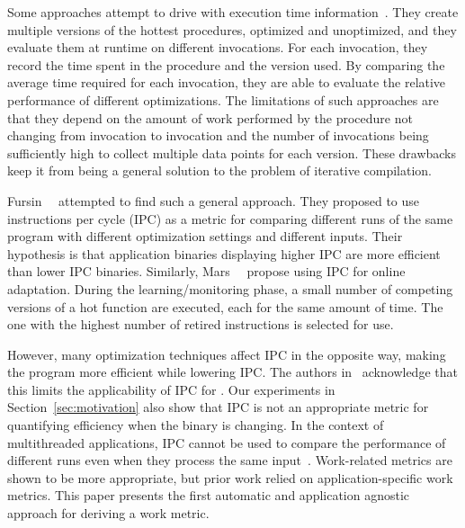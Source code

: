 Some approaches attempt to drive \itercomp with execution time information~\cite{fursin:hal-01257279,fursin:inria-00001054,tiwari2011online}. They create
multiple versions of the hottest procedures, optimized and unoptimized, and they evaluate them at runtime on different invocations.
For each invocation, they record the time spent in the procedure and the version used. By comparing the average time required for each
invocation, they are able to evaluate the relative performance of different optimizations. The limitations of such approaches are that they
depend on the amount of work performed by the procedure not changing from invocation to invocation and the number of
invocations being sufficiently high to collect multiple data points for each version. These drawbacks keep it from being a general solution
to the problem of iterative compilation.

Fursin~\etal~\cite{fursin07} attempted to find such a general approach. They proposed to use instructions per cycle (IPC)
as a metric for comparing different runs of the same program with different optimization settings and different inputs. Their hypothesis is
that application binaries displaying higher IPC are more efficient than lower IPC binaries. Similarly, Mars~\etal~\cite{Mars:2009:SBO:1545006.1545068}
propose using IPC for online adaptation. During the learning/monitoring phase, a small number of competing versions of a hot function are executed, each
for the same amount of time. The one with the highest number of retired instructions is selected for use. 

However, many optimization techniques affect
IPC in the opposite way, making the program more efficient while lowering IPC. The authors in~\cite{fursin07} acknowledge that this limits
the applicability of IPC for \itercomp. Our experiments in Section~\ref{sec:motivation} also show that IPC is not an appropriate metric
for quantifying efficiency when the binary is changing. In the context of multithreaded applications, IPC cannot be used to compare the performance of
different runs even when they process the same input~\cite{alameldeen06,eyerman08}. Work-related metrics are shown to be more appropriate, but prior work
relied on application-specific work metrics. This paper presents the first automatic and application agnostic approach for deriving a work metric.


